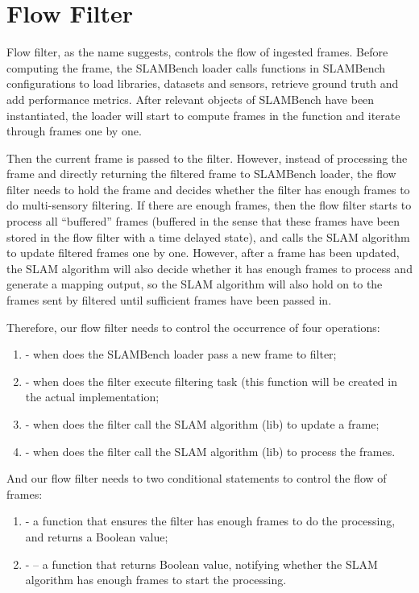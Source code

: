 
\section{Flow Filter}
Flow filter, as the name suggests, controls the flow of ingested frames. 
Before computing the frame, the SLAMBench loader calls functions in SLAMBench configurations to load libraries, datasets and sensors, retrieve ground truth and add performance metrics. 
After relevant objects of SLAMBench have been instantiated, the loader will start to compute frames in the  function and iterate through frames one by one.

Then the current frame is passed to the filter. 
However, instead of processing the frame and directly returning the filtered frame to SLAMBench loader, the flow filter needs to hold the frame and decides whether the filter has enough frames to do multi-sensory filtering. 
If there are enough frames, then the flow filter starts to process all “buffered” frames (buffered in the sense that these frames have been stored in the flow filter with a time delayed state), and calls the SLAM algorithm to update filtered frames one by one. 
However, after a frame has been updated, the SLAM algorithm will also decide whether it has enough frames to process and generate a mapping output, so the SLAM algorithm will also hold on to the frames sent by filtered until sufficient frames have been passed in. 

Therefore, our flow filter needs to control the occurrence of four operations: 
\begin{enumerate}
	\item {} - when does the SLAMBench loader pass a new frame to filter;
	\item {} - when does the filter execute filtering task (this function will be created in the actual implementation;
	\item {} - when does the filter call the SLAM algorithm (lib) to update a frame;
	\item {} - when does the filter call the SLAM algorithm (lib) to process the frames.
\end{enumerate}

And our flow filter needs to two conditional statements to control the flow of frames:
\begin{enumerate}
	\item {} - a function that ensures the filter has enough frames to do the processing, and returns a Boolean value;
	\item {} - – a function that returns Boolean value, notifying whether the SLAM algorithm has enough frames to start the processing.
\end{enumerate}

